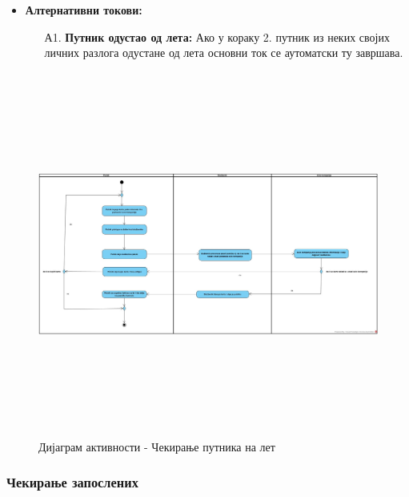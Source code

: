 \documentclass{article}
\begin{document}
\begin{itemize}
    \item \textbf{Алтернативни токови:}
    \begin{itemize}
        \item[А1.] \textbf{Путник одустао од лета:} Ако у кораку 2. путник из неких својих личних разлога одустане од лета основни ток се аутоматски ту завршава.
    \end{itemize}
   
\end{itemize}

\begin{figure}[H]
    \centering
    \includegraphics[width=1.1\textwidth, height=12cm]{Dijagrami_slike/cekiranje_putnika.jpg}
    \caption{Дијаграм активности - Чекирање путника на лет}
\end{figure}

\newpage
\subsubsection{Чекирање запослених}
\end{document}
